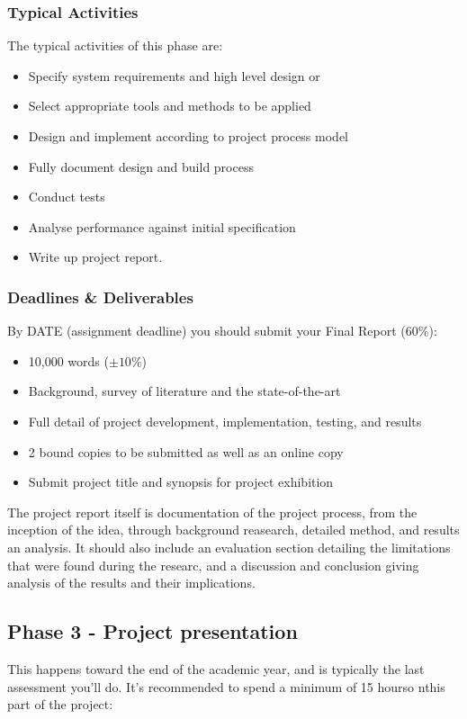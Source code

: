 \subsubsection{Typical Activities}

The typical activities of this phase are: 

\begin{itemize}
    \item Specify system requirements and high level design or
    \item Select appropriate tools and methods to be applied
    \item Design and implement according to project process model
    \item Fully document design and build process
    \item Conduct tests
    \item Analyse performance against initial specification
    \item Write up project report.
\end{itemize}

\subsubsection{Deadlines \& Deliverables}

By DATE (assignment deadline) you should submit your Final Report (60\%):
\label{TODO: Date}
\begin{itemize}
    \item 10,000 words ($\pm 10\%$)
    \item Background, survey of literature and the state-of-the-art
    \item Full detail of project development, implementation, testing, and results
    \item 2 bound copies to be submitted as well as an online copy
    \item Submit project title and synopsis for project exhibition
\end{itemize}

The project report itself is documentation of the project process, from the inception of the idea, through background reasearch, detailed method, and results an analysis. It should also include an evaluation section detailing the limitations that were found during the researc, and a discussion and conclusion giving analysis of the results and their implications. 

\subsection{Phase 3 - Project presentation}
This happens toward the end of the academic year, and is typically the last assessment you'll do. It's recommended to spend a minimum of 15 hourso nthis part of the project:

